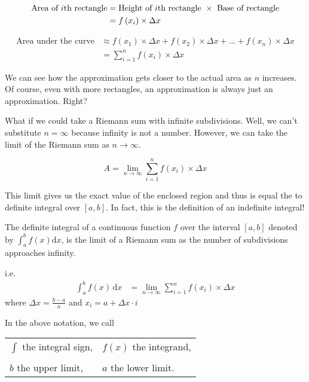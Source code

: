 \documentclass[11pt,a4paper]{book}
\begin{document}
\begin{align*}
\text{Area of \ensuremath{i}th rectangle} & =\text{Height of \ensuremath{i}th rectangle }\times\text{ Base of rectangle}\\
 & =f\left(x_{i}\right)\times\Delta x
\end{align*}

\begin{align*}
\text{Area under the curve} & \approx f\left(x_{1}\right)\times\Delta x+f\left(x_{2}\right)\times\Delta x+\ldots+f\left(x_{n}\right)\times\Delta x\\
 & =\sum_{i=1}^{n}f\left(x_{i}\right)\times\Delta x
\end{align*}

We can see how the approximation gets closer to the actual area as
$n$ increases. Of course, even with more rectangles, an approximation
is always just an approximation. Right?

What if we could take a Riemann sum with infinite subdivisions. Well,
we can't substitute $n=\infty$ because infinity is not a number.
However, we can take the limit of the Riemann sum as $n\rightarrow\infty$.

\[
A=\lim_{n\rightarrow\infty}\sum_{i=1}^{n}f(x_{i})\times\Delta x
\]

This limit gives us the exact value of the enclosed region and thus
is equal the to definite integral over $\left[a,b\right]$. In fact,
this is the definition of an indefinite integral!

\begin{tcolorbox}[colback=blue!5, colframe=black, boxrule=.4pt, sharpish corners]
The definite integral of a continuous function $f$ over the interval $[a,b]$ denoted by ${\displaystyle \int_{a}^{b}f(x)\mathrm{d}x}$, is the limit of a Riemann sum as the number of subdivisions approaches infinity.

i.e. \begin{align*} \int_{a}^{b}f(x)\,\mathrm{d}x & =\lim_{n\rightarrow\infty}\sum_{i=1}^{n}f(x_{i})\times\Delta x \end{align*}
where $\Delta x={\displaystyle \frac{b-a}{n}}$ and $x_{i}=a+\Delta x\cdot i$%
\end{tcolorbox}

In the above notation, we call

\begin{tabular}{ll}
${\displaystyle \int}$ \hspace{0.5cm}the integral sign, & \hspace{1cm}$f(x)$ \hspace{0.5cm}the integrand,\tabularnewline
 & \tabularnewline
$b$ \hspace{0.5cm}the upper limit, & \hspace{1cm}$a$\hspace{0.5cm} the lower limit.\tabularnewline
\end{tabular}
\end{document}
